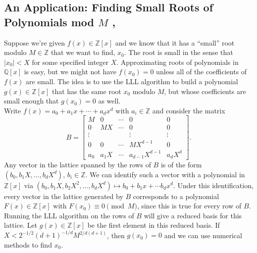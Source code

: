 \documentclass[11pt,letterpaper]{article}
\newcommand{\integers}{\mathbb{Z}}
\newcommand{\rationals}{\mathbb{Q}}
\theoremstyle{definition}
\begin{document}
\subsection*{An Application: Finding Small Roots of Polynomials mod $M$ \cite{coppersmith96}, \cite{galbraith18}}
Suppose we're given $f(x)\in \integers[x]$ and we know that it has a ``small'' root modulo $M\in \integers$ that we want to find, $x_0$. The root is small in the sense that $|x_0|<X$ for some specified integer $X$. Approximating roots of polynomials in $\rationals[x]$ is easy, but we might not have $f(x_0) = 0$ unless all of the coefficients of $f(x)$ are small. The idea is to use the LLL algorithm to build a polynomial $g(x)\in \integers[x]$ that has the same root $x_0$ modulo $M$, but whose coefficients are small enough that $g(x_0) = 0$ as well.\\
\noindent Write $f(x) = a_0 + a_1x+\cdots + a_dx^d$ with $a_i\in \integers$ and consider the matrix 
\[
B = \begin{bmatrix}
	M & 0 & \cdots & 0 & 0\\
	0 & MX & \cdots & 0 & 0\\
	\vdots &  && \vdots & \vdots\\
	0 & 0 & \cdots & MX^{d-1} & 0\\
	a_0 & a_1X & \cdots & a_{d-1}X^{d-1} & a_dX^d
\end{bmatrix}.
\]
Any vector in the lattice spanned by the rows of $B$ is of the form $(b_0, b_1X, \ldots, b_dX^d)$, $b_i\in \integers$. We can identify such a vector with a polynomial in $\integers[x]$ via $(b_0, b_1X, b_2X^2, \ldots, b_dX^d)\mapsto b_0 + b_1x + \cdots b_dx^d$.
Under this identification, every vector in the lattice generated by $B$ corresponds to a polynomial $F(x)\in \integers[x]$ with $F(x_0)\equiv 0 \pmod{M}$, since this is true for every row of $B$.\\
Running the LLL algorithm on the rows of $B$ will give a reduced basis for this lattice. Let $g(x)\in \integers[x]$ be the first element in this reduced basis. If $X<2^{-1/2}(d+1)^{-1/d}M^{2/d(d+1)}$, then $g(x_0) = 0$ and we can use numerical methods to find $x_0$.

\printbibliography
\end{document}
